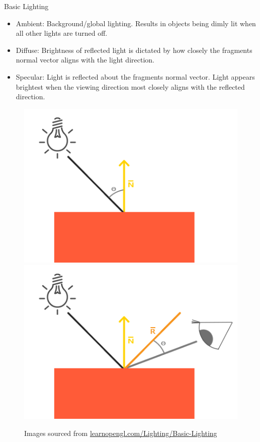 \documentclass{beamer}
\begin{document}
\begin{frame}[fragile]{Basic Lighting}
    \begin{itemize}
        \item Ambient: Background/global lighting. Results in objects being dimly lit when all
              other lights are turned off.
        \item Diffuse: Brightness of reflected light is dictated by how closely the fragments
              normal vector aligns with the light direction.
        \item Specular: Light is reflected about the fragments normal vector. Light appears
              brightest when the viewing direction most closely aligns with the reflected direction.
    \end{itemize}

    \begin{figure}
        \includegraphics[height=0.30\textheight]{images/diffuse_light.png}
        \includegraphics[height=0.30\textheight]{images/specular_light.png}
        \caption{\footnotesize{Images sourced from \url{learnopengl.com/Lighting/Basic-Lighting}}}
    \end{figure}
\end{frame}
\end{document}
